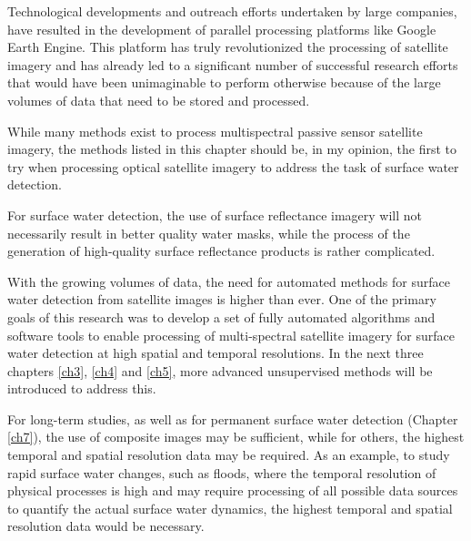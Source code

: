 Technological developments and outreach efforts undertaken by large companies, have resulted in the development of parallel processing platforms like Google Earth Engine. This platform has truly revolutionized the processing of satellite imagery and has already led to a significant number of successful research efforts that would have been unimaginable to perform otherwise because of the large volumes of data that need to be stored and processed.

While many methods exist to process multispectral passive sensor satellite imagery, the methods listed in this chapter should be, in my opinion, the first to try when processing optical satellite imagery to address the task of surface water detection.

For surface water detection, the use of surface reflectance imagery will not necessarily result in better quality water masks, while the process of the generation of high-quality surface reflectance products is rather complicated.

With the growing volumes of data, the need for automated methods for surface water detection from satellite images is higher than ever. One of the primary goals of this research was to develop a set of fully automated algorithms and software tools to enable processing of multi-spectral satellite imagery for surface water detection at high spatial and temporal resolutions. In the next three chapters \ref{ch3}, \ref{ch4} and \ref{ch5}, more advanced unsupervised methods will be introduced to address this. 

For long-term studies, as well as for permanent surface water detection (Chapter \ref{ch7}), the use of composite images may be sufficient, while for others, the highest temporal and spatial resolution data may be required. As an example, to study rapid surface water changes, such as floods, where the temporal resolution of physical processes is high and may require processing of all possible data sources to quantify the actual surface water dynamics, the highest temporal and spatial resolution data would be necessary.

